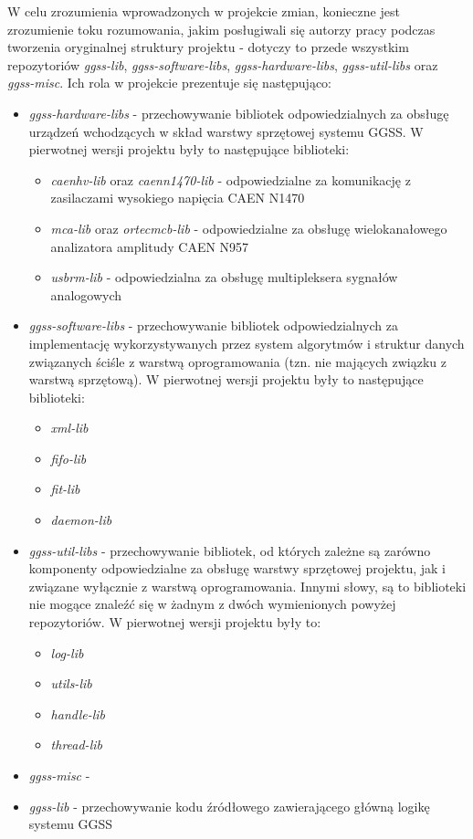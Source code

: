 W celu zrozumienia wprowadzonych w projekcie zmian, konieczne jest zrozumienie toku rozumowania, jakim posługiwali się autorzy pracy podczas tworzenia oryginalnej struktury projektu - dotyczy to przede wszystkim repozytoriów \emph{ggss-lib}, \emph{ggss-software-libs}, \emph{ggss-hardware-libs}, \emph{ggss-util-libs} oraz \emph{ggss-misc}. Ich rola w projekcie prezentuje się następująco:
\begin{itemize}
    \item \emph{ggss-hardware-libs} - przechowywanie bibliotek odpowiedzialnych za obsługę urządzeń wchodzących w skład warstwy sprzętowej systemu GGSS. W pierwotnej wersji projektu były to następujące biblioteki:
    \begin{itemize}
        \item \emph{caenhv-lib} oraz \emph{caenn1470-lib} - odpowiedzialne za komunikację z zasilaczami wysokiego napięcia CAEN N1470
        \item \emph{mca-lib} oraz \emph{ortecmcb-lib} - odpowiedzialne za obsługę wielokanałowego analizatora amplitudy CAEN N957
        \item \emph{usbrm-lib} - odpowiedzialna za obsługę multipleksera sygnałów analogowych
    \end{itemize}
    \item \emph{ggss-software-libs} - przechowywanie bibliotek odpowiedzialnych za implementację wykorzystywanych przez system algorytmów i struktur danych związanych ściśle z warstwą oprogramowania (tzn. nie mających związku z warstwą sprzętową). W pierwotnej wersji projektu były to następujące biblioteki:
    \begin{itemize}
        \item \emph{xml-lib}
        \item \emph{fifo-lib}
        \item \emph{fit-lib}
        \item \emph{daemon-lib}
    \end{itemize}
    \item \emph{ggss-util-libs} - przechowywanie bibliotek, od których zależne są zarówno komponenty odpowiedzialne za obsługę warstwy sprzętowej projektu, jak i związane wyłącznie z warstwą oprogramowania. Innymi słowy, są to biblioteki nie mogące znaleźć się w żadnym z dwóch wymienionych powyżej repozytoriów. W pierwotnej wersji projektu były to:
    \begin{itemize}
        \item \emph{log-lib}
        \item \emph{utils-lib}
        \item \emph{handle-lib}
        \item \emph{thread-lib}
    \end{itemize}
    \item \emph{ggss-misc} - 
    \item \emph{ggss-lib} - przechowywanie kodu źródłowego zawierającego główną logikę systemu GGSS
\end{itemize}

